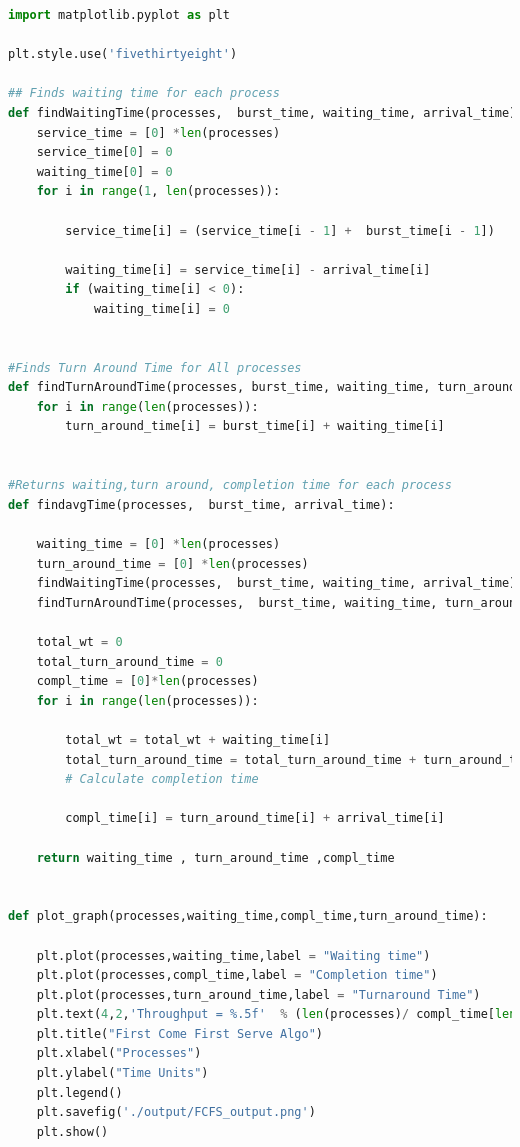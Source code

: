 \documentclass[11pt,a4paper]{report}
\begin{document}
\begin{lstlisting}[language=Python,caption=fcfs source code]
import matplotlib.pyplot as plt

plt.style.use('fivethirtyeight')

## Finds waiting time for each process
def findWaitingTime(processes,  burst_time, waiting_time, arrival_time):  
    service_time = [0] *len(processes) 
    service_time[0] = 0
    waiting_time[0] = 0
    for i in range(1, len(processes)):  
           
        service_time[i] = (service_time[i - 1] +  burst_time[i - 1])  
  
        waiting_time[i] = service_time[i] - arrival_time[i]  
        if (waiting_time[i] < 0): 
            waiting_time[i] = 0
      

#Finds Turn Around Time for All processes
def findTurnAroundTime(processes, burst_time, waiting_time, turn_around_time):  
    for i in range(len(processes)): 
        turn_around_time[i] = burst_time[i] + waiting_time[i]  
  
  
#Returns waiting,turn around, completion time for each process
def findavgTime(processes,  burst_time, arrival_time):  

    waiting_time = [0] *len(processes)
    turn_around_time = [0] *len(processes) 
    findWaitingTime(processes,  burst_time, waiting_time, arrival_time)  
    findTurnAroundTime(processes,  burst_time, waiting_time, turn_around_time)  

    total_wt = 0
    total_turn_around_time = 0
    compl_time = [0]*len(processes)
    for i in range(len(processes)): 
  
        total_wt = total_wt + waiting_time[i]  
        total_turn_around_time = total_turn_around_time + turn_around_time[i]  
        # Calculate completion time

        compl_time[i] = turn_around_time[i] + arrival_time[i] 

    return waiting_time , turn_around_time ,compl_time


def plot_graph(processes,waiting_time,compl_time,turn_around_time):

    plt.plot(processes,waiting_time,label = "Waiting time")
    plt.plot(processes,compl_time,label = "Completion time")
    plt.plot(processes,turn_around_time,label = "Turnaround Time")
    plt.text(4,2,'Throughput = %.5f'  % (len(processes)/ compl_time[len(processes)-1]))
    plt.title("First Come First Serve Algo")
    plt.xlabel("Processes")
    plt.ylabel("Time Units")
    plt.legend()
    plt.savefig('./output/FCFS_output.png')
    plt.show()




\end{lstlisting}
\end{document}
